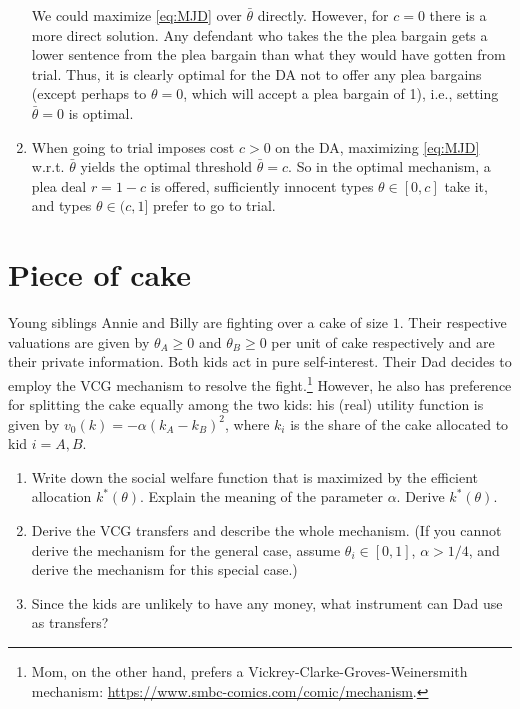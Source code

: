 \documentclass[a4paper]{article}
\begin{document}
\begin{enumerate}
		We could maximize \eqref{eq:MJD} over $\bar{\theta}$ directly. However, for $c=0$ there is a more direct solution. Any defendant who takes the the plea bargain gets a lower sentence from the plea bargain than what they would have gotten from trial. Thus, it is clearly optimal for the DA not to offer any plea bargains (except perhaps to $\theta=0$, which will accept a plea bargain of 1), i.e., setting $\bar{\theta}=0$ is optimal.
		
		\item When going to trial imposes cost $c>0$ on the DA, maximizing \eqref{eq:MJD} w.r.t. $\bar{\theta}$ yields the optimal threshold $\bar{\theta}=c$. So in the optimal mechanism, a plea deal $r=1-c$ is offered, sufficiently innocent types $\theta \in [0,c]$ take it, and types $\theta \in (c,1]$ prefer to go to trial.
	\end{enumerate}
	\fi
	
	
	
	\section{Piece of cake}
	
	Young siblings Annie and Billy are fighting over a cake of size $1$. Their respective valuations are given by $\theta_A \geq 0$ and $\theta_B \geq 0$ per unit of cake respectively and are their private information. Both kids act in pure self-interest. Their Dad decides to employ the VCG mechanism to resolve the fight.\footnote{Mom, on the other hand, prefers a Vickrey-Clarke-Groves-Weinersmith mechanism: \url{https://www.smbc-comics.com/comic/mechanism}.} 
	However, he also has preference for splitting the cake equally among the two kids: his (real) utility function is given by $v_0(k) = -\alpha(k_A - k_B)^2$, where $k_i$ is the share of the cake allocated to kid $i=A,B$.
	
	\begin{enumerate}
		\item Write down the social welfare function that is maximized by the efficient allocation $k^*(\theta)$. Explain the meaning of the parameter $\alpha$. Derive $k^*(\theta)$. 
		
		\item Derive the VCG transfers and describe the whole mechanism. (If you cannot derive the mechanism for the general case, assume $\theta_i \in [0,1]$, $\alpha > 1/4$, and derive the mechanism for this special case.)
		
		\item Since the kids are unlikely to have any money, what instrument can Dad use as transfers?
		
	\end{enumerate}
	
\end{document}
